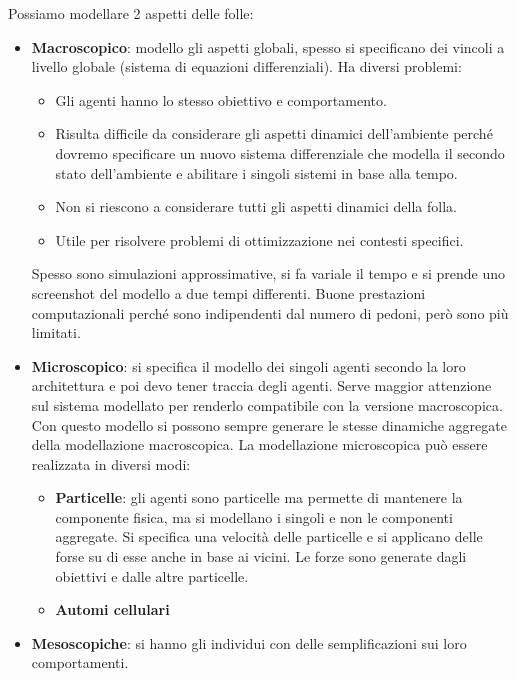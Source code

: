 Possiamo modellare 2 aspetti delle folle:
\begin{itemize}
    \item \textbf{Macroscopico}: modello gli aspetti globali, spesso si specificano
          dei vincoli a livello globale (sistema di equazioni differenziali). Ha
          diversi problemi:
          \begin{itemize}
              \item Gli agenti hanno lo stesso obiettivo e comportamento.
              \item Risulta difficile da considerare gli aspetti dinamici
                    dell'ambiente perché dovremo specificare un nuovo sistema
                    differenziale che modella il secondo stato dell'ambiente e
                    abilitare i singoli sistemi in base alla tempo.
              \item Non si riescono a considerare tutti gli aspetti dinamici
                    della folla.
              \item Utile per risolvere problemi di ottimizzazione nei contesti
                    specifici.
          \end{itemize}
          Spesso sono simulazioni approssimative, si fa variale il tempo e si
          prende uno screenshot del modello a due tempi differenti. Buone
          prestazioni computazionali perché sono indipendenti dal numero
          di pedoni, però sono più limitati.
    \item \textbf{Microscopico}: si specifica il modello dei singoli agenti
          secondo la loro architettura e poi devo tener traccia degli agenti.
          Serve maggior attenzione sul sistema modellato per renderlo compatibile
          con la versione macroscopica. Con questo modello si possono sempre generare le
          stesse dinamiche aggregate della modellazione macroscopica.
          La modellazione microscopica può essere realizzata in diversi modi:
          \begin{itemize}
              \item \textbf{Particelle}: gli agenti sono particelle ma permette
                    di mantenere la componente fisica, ma si modellano i singoli
                    e non le componenti aggregate. Si specifica una velocità delle
                    particelle e si applicano delle forse su di esse anche in
                    base ai vicini. Le forze sono generate dagli obiettivi e dalle
                    altre particelle.
              \item \textbf{Automi cellulari}
          \end{itemize}
    \item \textbf{Mesoscopiche}: si hanno gli individui con delle semplificazioni
          sui loro comportamenti.
\end{itemize}

